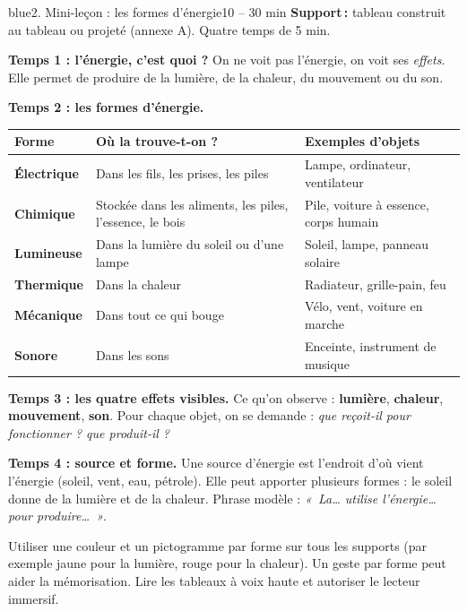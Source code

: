 \documentclass[11pt,a4paper]{article}
\begin{document}
\begin{etape}{blue}{2. Mini-leçon : les formes d'énergie}{10 -- 30 min}
\textbf{Support\,:} tableau construit au tableau ou projeté (annexe A). Quatre temps de 5 min.

\medskip
\textbf{Temps 1 : l'énergie, c'est quoi ?} On ne voit pas l'énergie, on voit ses \emph{effets}. Elle permet de produire de la lumière, de la chaleur, du mouvement ou du son.

\textbf{Temps 2 : les formes d'énergie.}
\begin{center}
\begin{tabularx}{\linewidth}{>{\bfseries}p{2.6cm}Y Y}
\toprule
Forme & Où la trouve-t-on ? & Exemples d'objets\\
\midrule
Électrique & Dans les fils, les prises, les piles & Lampe, ordinateur, ventilateur\\
Chimique & Stockée dans les aliments, les piles, l'essence, le bois & Pile, voiture à essence, corps humain\\
Lumineuse & Dans la lumière du soleil ou d'une lampe & Soleil, lampe, panneau solaire\\
Thermique & Dans la chaleur & Radiateur, grille-pain, feu\\
Mécanique & Dans tout ce qui bouge & Vélo, vent, voiture en marche\\
Sonore & Dans les sons & Enceinte, instrument de musique\\
\bottomrule
\end{tabularx}
\end{center}

\textbf{Temps 3 : les quatre effets visibles.} Ce qu'on observe : \textbf{lumière}, \textbf{chaleur}, \textbf{mouvement}, \textbf{son}. Pour chaque objet, on se demande : \emph{que reçoit-il pour fonctionner ? que produit-il ?}

\textbf{Temps 4 : source et forme.} Une source d'énergie est l'endroit d'où vient l'énergie (soleil, vent, eau, pétrole). Elle peut apporter plusieurs formes : le soleil donne de la lumière et de la chaleur. Phrase modèle : \textit{«~La\ldots{} utilise l'énergie\ldots{} pour produire\ldots~»}.

\begin{astuce}
Utiliser une couleur et un pictogramme par forme sur tous les supports (par exemple jaune pour la lumière, rouge pour la chaleur). Un geste par forme peut aider la mémorisation. Lire les tableaux à voix haute et autoriser le lecteur immersif.
\end{astuce}
\end{etape}
\end{document}
